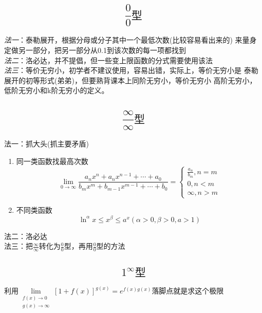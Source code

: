 \documentclass[a4paper,11pt]{book}
\begin{document}
\subsection*{\[\frac{0}{0}\text{型}\]}

\vspace{2ex}
\emph{法一}：泰勒展开，根据分母或分子其中一个最低次数(比较容易看出来的)
来量身定做另一部分，把另一部分从0.1到该次数的每一项都找到\\


\noindent  \emph{法二}：洛必达，并不提倡，但一些变上限函数的分式需要使用该法\\


\noindent  \emph{法三}：等价无穷小，初学者不建议使用，容易出错，实际上，等价无穷小是
泰勒展开的初等形式(弟弟)，但要熟背课本上同阶无穷小，等价无穷小
高阶无穷小，低阶无穷小和k阶无穷小的定义。


\subsection*{\[\frac{\infty}{\infty}\text{型}\]}

法一：抓大头(抓主要矛盾)
\begin{enumerate}
\item 同一类函数找最高次数 \[\lim_{0 \rightarrow \infty}\frac{a_{n} x^{n}+a_{n} x^{n-1}+\cdots+a_{0}}{b_{m} x^{m}+b_{m-1} x^{m-1}+\cdots+b_{0}}=\left\{\begin{array}{l}
    \frac{a_{n}}{b_{m}}, n=m \\
    0, n<m \\
    \infty, n>m
    \end{array}\right.\]
\item 不同类函数\[\ln ^{\alpha} x \leq x^{\beta} \leq a^{x}(\alpha>0, \beta>0, a>1)\]
\end{enumerate} 

\noindent 法二：洛必达 \\

\noindent 法三：把$\frac{\infty}{\infty}$转化为$\frac{0}{0}$型，再用$\frac{0}{0}$型的方法


\subsection*{\[1^{\infty}\text{型}\]}
利用$\lim\limits_{\begin{array}{l}
    f(x) \rightarrow 0 \\
    g(x) \rightarrow \infty
    \end{array}} [1+f(x)]^{g(x)}=e^{f(x) g(x)}$落脚点就是求这个极限
\end{document}
